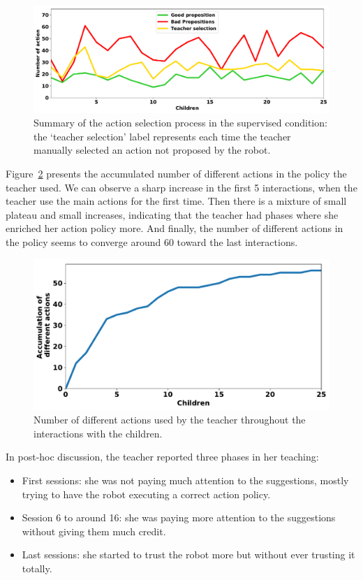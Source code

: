 \begin{figure}[ht]
	\includegraphics[width=1\linewidth]{./summary_supervision.pdf}
	\centering
	\caption{Summary of the action selection process in the supervised condition: the `teacher selection' label represents each time the teacher manually selected an action not proposed by the robot.}
	\label{fig:tutoring_supervision}
\end{figure}


Figure~\ref{fig:tutoring_actions} presents the accumulated number of different actions in the policy the teacher used. We can observe a sharp increase in the first 5 interactions, when the teacher use the main actions for the first time. Then there is a mixture of small plateau and small increases, indicating that the teacher had phases where she enriched her action policy more. And finally, the number of different actions in the policy seems to converge around 60 toward the last interactions.

\begin{figure}[ht]
	\includegraphics[width=.7\linewidth]{./number_actions.pdf}
	\centering
	\caption{Number of different actions used by the teacher throughout the interactions with the children.}
	\label{fig:tutoring_actions}
\end{figure}


In post-hoc discussion, the teacher reported three phases in her teaching: 
\begin{itemize}
	\item First sessions: she was not paying much attention to the suggestions, mostly trying to have the robot executing a correct action policy.
	\item Session 6 to around 16: she was paying more attention to the suggestions without giving them much credit.
	\item Last sessions: she started to trust the robot more but without ever trusting it totally.
\end{itemize}

